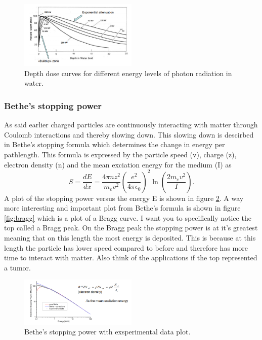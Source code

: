 \documentclass[jmp, amsmath, amssymb, reprint]{article}
\numberwithin{equation}{section}
\newcommand{\lp}{\left(}
\newcommand{\rp}{\right)}
\begin{document}
\begin{multicols}{2}
\begin{figure}[H]
	\centering
  	\includegraphics[width=0.50\textwidth]{dept_dose.png}
	\caption{Depth dose curves for different energy levels of photon radiation in water.}
	\label{fig:depth_dose}
\end{figure}

\subsubsection{Bethe's stopping power}

As said earlier charged particles are continuously interacting with matter through Coulomb interactions and thereby slowing down. This slowing down is descirbed in Bethe's stopping formula which determines the change in energy per pathlength. This formula is expressed by the particle speed (v), charge (z), electron density (n) and the mean exciation energy for the medium (I) as
\begin{equation}
S=\frac{dE}{dx}=\frac{4\pi nz^2}{m_ev^2}\lp\frac{e^2}{4\pi\epsilon_0}\rp^2\ln(\frac{2m_ev^2}{I}).
\end{equation}
A plot of the stopping power versus the energy E is shown in figure \ref{fig:bethes_energy}. A way more interesting and important plot from Bethe's formula is shown in figure \ref{fig:bragg} which is a plot of a Bragg curve. I want you to specifically notice the top called a Bragg peak. On the Bragg peak the stopping power is at it's greatest meaning that on this length the most energy is deposited. This is because at this length the particle has lower speed compared to before and therefore has more time to interact with matter. Also think of the applications if the top represented a tumor.


\begin{figure}[H]
	\centering
  	\includegraphics[width=0.50\textwidth]{bethe_energy.png}
	\caption{Bethe's stopping power with exsperimental data plot.}
	\label{fig:bethes_energy}
\end{figure}


\end{multicols}
\end{document}
